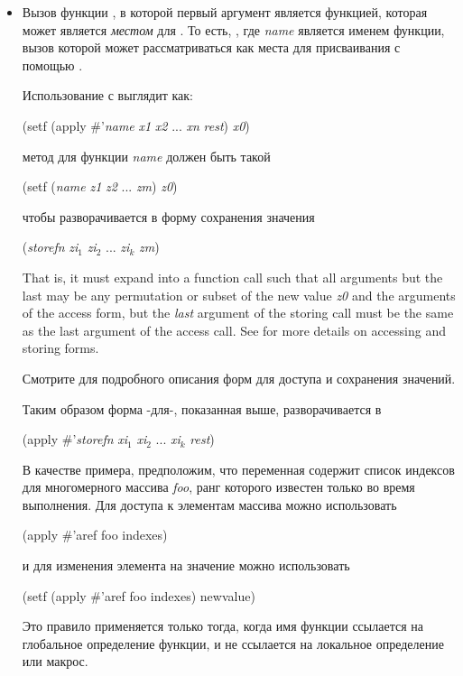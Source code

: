 \begin{defmac}
\begin{itemize}
\item 
Вызов функции , в которой первый аргумент является функцией, которая
может является \emph{местом} для .
То есть, , где \emph{name} является именем функции,
вызов которой может рассматриваться как места для присваивания с помощью .

Использование  с  выглядит как:
\begin{lisp}
(setf (apply \#'\emph{name} \emph{x1} \emph{x2} ... \emph{xn} \emph{rest}) \emph{x0})
\end{lisp}
 метод для функции \emph{name} должен быть такой
\begin{lisp}
(setf (\emph{name} \emph{z1} \emph{z2} ... \emph{zm}) \emph{z0})
\end{lisp}
чтобы разворачивается в форму сохранения значения
\begin{lisp}
(\emph{storefn} \emph{zi${}_1$} \emph{zi${}_2$} ... \emph{zi${}_k$} \emph{zm})
\end{lisp}
That is, it must expand into a function call such that all arguments but
the last may be any permutation or subset of the new value \emph{z0} and
the arguments of the access form, but the \emph{last} argument of the storing
call must be the same as the last argument of the access call.
See  for more details on accessing
and storing forms.

Смотрите  для подробного описания форм для доступа и
сохранения значений.

Таким образом форма -для-, показанная выше, разворачивается в
\begin{lisp}
(apply \#'\emph{storefn} \emph{xi${}_1$} \emph{xi${}_2$} ... \emph{xi${}_k$} \emph{rest})
\end{lisp}
В качестве примера, предположим, что переменная  содержит список
индексов для многомерного массива \emph{foo}, ранг которого известен только во
время выполнения. Для доступа к элементам массива можно использовать
\begin{lisp}
(apply \#'aref foo indexes)
\end{lisp}
и для изменения элемента на значение  можно использовать
\begin{lisp}
(setf (apply \#'aref foo indexes) newvalue)
\end{lisp}

Это правило применяется только тогда, когда имя функции ссылается на глобальное
определение функции, и не ссылается на локальное определение или макрос.


\end{itemize}
\end{defmac}
